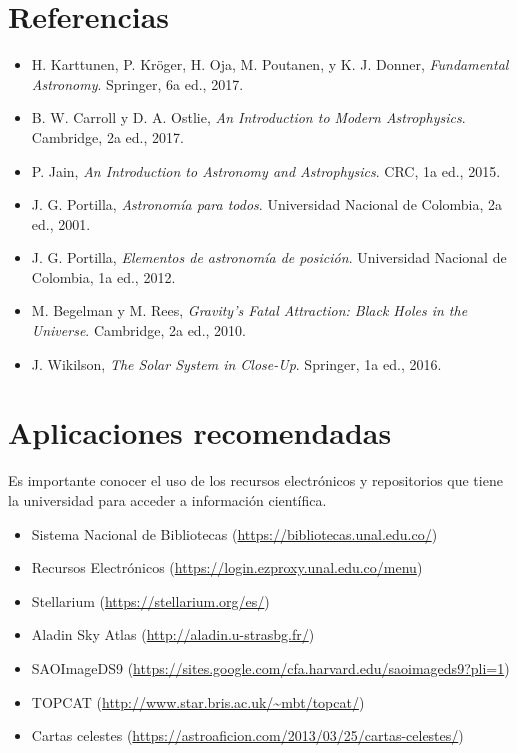 \documentclass[12pt]{article}
\begin{document}
\section*{Referencias}

\begin{itemize}
    \item H. Karttunen, P. Kröger, H. Oja, M. Poutanen, y K. J. Donner, \textit{Fundamental Astronomy}. Springer, 6a ed., 2017.
    \item B. W. Carroll y D. A. Ostlie, \textit{An Introduction to Modern Astrophysics}. Cambridge, 2a ed., 2017.
    \item P. Jain, \textit{An Introduction to Astronomy and Astrophysics}. CRC, 1a ed., 2015.
    \item J. G. Portilla, \textit{Astronomía para todos}. Universidad Nacional de Colombia, 2a ed., 2001.
    \item J. G. Portilla, \textit{Elementos de astronomía de posición}. Universidad Nacional de Colombia, 1a ed., 2012.
    \item M. Begelman y M. Rees, \textit{Gravity’s Fatal Attraction: Black Holes in the Universe}. Cambridge, 2a ed., 2010.
    \item J. Wikilson, \textit{The Solar System in Close-Up}. Springer, 1a ed., 2016.
\end{itemize}

\section*{Aplicaciones recomendadas}

Es importante conocer el uso de los recursos electrónicos y repositorios que tiene la universidad para acceder a información científica.
\begin{itemize}
    \item Sistema Nacional de Bibliotecas (\url{https://bibliotecas.unal.edu.co/})
    \item Recursos Electrónicos (\url{https://login.ezproxy.unal.edu.co/menu})
\end{itemize}
\begin{itemize}
    \item Stellarium (\url{https://stellarium.org/es/})
    \item Aladin Sky Atlas (\url{http://aladin.u-strasbg.fr/})
    \item SAOImageDS9 (\url{https://sites.google.com/cfa.harvard.edu/saoimageds9?pli=1})
    \item TOPCAT (\url{http://www.star.bris.ac.uk/~mbt/topcat/})
    \item Cartas celestes (\url{https://astroaficion.com/2013/03/25/cartas-celestes/})
\end{itemize}
\end{document}
